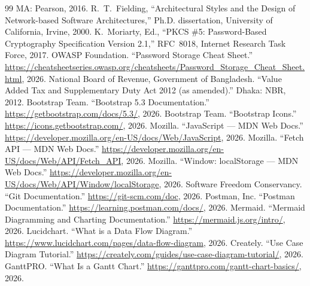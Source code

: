 \documentclass[12pt,a4paper]{report}
\begin{document}
\begin{thebibliography}{99}
                     MA: Pearson, 2016.
  R.~T.~Fielding, ``Architectural Styles and the Design of
                     Network-based Software Architectures,'' Ph.D. dissertation,
                     University of California, Irvine, 2000.
   K.~Moriarty, Ed., ``PKCS \#5: Password-Based Cryptography
                     Specification Version 2.1,'' RFC~8018, Internet Research Task
                     Force, 2017.
     OWASP Foundation. ``Password Storage Cheat Sheet.''
                     \url{https://cheatsheetseries.owasp.org/cheatsheets/Password_Storage_Cheat_Sheet.html},
                     2026.
       National Board of Revenue, Government of Bangladesh. ``Value Added
                     Tax and Supplementary Duty Act 2012 (as amended).'' Dhaka: NBR,
                     2012.
 Bootstrap Team. ``Bootstrap 5.3 Documentation.''
                     \url{https://getbootstrap.com/docs/5.3/}, 2026.
 Bootstrap Team. ``Bootstrap Icons.''
                     \url{https://icons.getbootstrap.com/}, 2026.
     Mozilla. ``JavaScript --- MDN Web Docs.''
                     \url{https://developer.mozilla.org/en-US/docs/Web/JavaScript}, 2026.
  Mozilla. ``Fetch API --- MDN Web Docs.''
                     \url{https://developer.mozilla.org/en-US/docs/Web/API/Fetch_API}, 2026.
  Mozilla. ``Window: localStorage --- MDN Web Docs.''
                     \url{https://developer.mozilla.org/en-US/docs/Web/API/Window/localStorage},
                     2026.
       Software Freedom Conservancy. ``Git Documentation.''
                     \url{https://git-scm.com/doc}, 2026.
   Postman, Inc. ``Postman Documentation.''
                     \url{https://learning.postman.com/docs/}, 2026.
   Mermaid. ``Mermaid Diagramming and Charting Documentation.''
                     \url{https://mermaid.js.org/intro/}, 2026.
       Lucidchart. ``What is a Data Flow Diagram.''
                     \url{https://www.lucidchart.com/pages/data-flow-diagram}, 2026.
   Creately. ``Use Case Diagram Tutorial.''
                     \url{https://creately.com/guides/use-case-diagram-tutorial/}, 2026.
     GanttPRO. ``What Is a Gantt Chart.''
                     \url{https://ganttpro.com/gantt-chart-basics/}, 2026.

\end{thebibliography}
\end{document}
